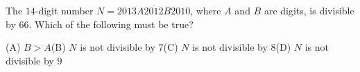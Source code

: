 The $14$-digit number $N=\overline{2013A2012B2010}$, where $A$ and $B$ are digits, is divisible by $66$. Which of the following must be true?

(A) $B>A$\qquad(B) $N$ is not divisible by $7$\qquad(C) $N$ is not divisible by $8$\qquad(D) $N$ is not divisible by $9$
